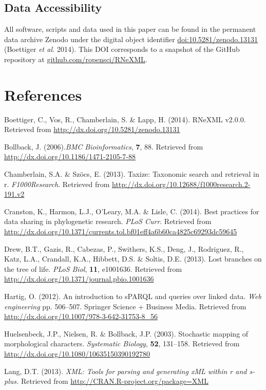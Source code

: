 \documentclass[author-year, review, 11pt]{elsarticle} %
\begin{document}
\subsection{Data Accessibility}\label{data-accessibility}

All software, scripts and data used in this paper can be found in the
permanent data archive Zenodo under the digital object identifier
\url{doi:10.5281/zenodo.13131} (Boettiger \emph{et al.} 2014). This DOI
corresponds to a snapshot of the GitHub repository at
\href{https://github.com/ropensci/RNeXML}{github.com/ropensci/RNeXML}.

\section*{References}\label{references}

Boettiger, C., Vos, R., Chamberlain, S. \& Lapp, H. (2014). RNeXML
v2.0.0. Retrieved from \url{http://dx.doi.org/10.5281/zenodo.13131}

Bollback, J. (2006).\emph{BMC Bioinformatics}, \textbf{7}, 88. Retrieved
from \url{http://dx.doi.org/10.1186/1471-2105-7-88}

Chamberlain, S.A. \& Sz{ö}cs, E. (2013). Taxize: Taxonomic search and
retrieval in r. \emph{F1000Research}. Retrieved from
\url{http://dx.doi.org/10.12688/f1000research.2-191.v2}

Cranston, K., Harmon, L.J., O'Leary, M.A. \& Lisle, C. (2014). Best
practices for data sharing in phylogenetic research. \emph{PLoS Curr}.
Retrieved from
\url{http://dx.doi.org/10.1371/currents.tol.bf01eff4a6b60ca4825c69293dc59645}

Drew, B.T., Gazis, R., Cabezas, P., Swithers, K.S., Deng, J., Rodriguez,
R., Katz, L.A., Crandall, K.A., Hibbett, D.S. \& Soltis, D.E. (2013).
Lost branches on the tree of life. \emph{PLoS Biol}, \textbf{11},
e1001636. Retrieved from
\url{http://dx.doi.org/10.1371/journal.pbio.1001636}

Hartig, O. (2012). An introduction to sPARQL and queries over linked
data. \emph{Web engineering} pp. 506--507. Springer Science + Business
Media. Retrieved from
\url{http://dx.doi.org/10.1007/978-3-642-31753-8_56}

Huelsenbeck, J.P., Nielsen, R. \& Bollback, J.P. (2003). Stochastic
mapping of morphological characters. \emph{Systematic Biology},
\textbf{52}, 131--158. Retrieved from
\url{http://dx.doi.org/10.1080/10635150390192780}

Lang, D.T. (2013). \emph{XML: Tools for parsing and generating xML
within r and s-plus.} Retrieved from
\url{http://CRAN.R-project.org/package=XML}
\end{document}
